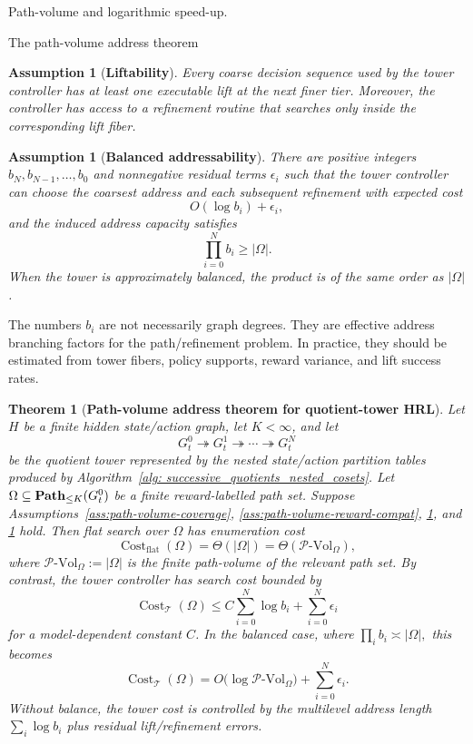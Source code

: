 \documentclass[11pt]{article}
\newtheorem{assumption}[subsubsection]{Assumption}
\newtheorem{theorem}[subsubsection]{Theorem}
\newcommand{\PVol}{\mathcal{P}\text{-}\mathrm{Vol}}
\newcommand{\cost}{\operatorname{Cost}}
\begin{document}
\begin{section}{Path-volume and logarithmic speed-up.}
\begin{subsection}{The path-volume address theorem}
\begin{assumption}[{\bf Liftability}]\label{ass:path-volume-liftability}
\normalfont
Every coarse decision sequence used by the tower controller has at least one executable lift at the next finer tier. Moreover, the controller has access to a refinement routine that searches only inside the corresponding lift fiber.
\end{assumption}

\begin{assumption}[{\bf Balanced addressability}]\label{ass:path-volume-balanced}
\normalfont
There are positive integers
$
b_N,b_{N-1},\ldots,b_0
$
and nonnegative residual terms $\epsilon_i$ such that the tower controller can choose the coarsest address and each subsequent refinement with expected cost
$$
O(\log b_i)+\epsilon_i,
$$
and the induced address capacity satisfies
$$
\prod_{i=0}^{N}b_i\ge |\Omega|.
$$
When the tower is approximately balanced, the product is of the same order as $|\Omega|$.
\end{assumption}

The numbers $b_i$ are not necessarily graph degrees. They are effective address branching factors for the path/refinement problem. In practice, they should be estimated from tower fibers, policy supports, reward variance, and lift success rates.

\begin{theorem}[{\bf Path-volume address theorem for quotient-tower HRL}]\label{thm:path-volume-address}
Let $H$ be a finite hidden state/action graph, let $K<\infty$, and let
$$
G_t^0 \twoheadrightarrow G_t^1 \twoheadrightarrow \cdots \twoheadrightarrow G_t^N
$$
be the quotient tower represented by the nested state/action partition tables produced by Algorithm~\ref{alg: successive_quotients_nested_cosets}. Let
$
\Omega\subseteq\bold{Path}_{\le K}(G_t^0)
$
be a finite reward-labelled path set. Suppose Assumptions~\ref{ass:path-volume-coverage}, \ref{ass:path-volume-reward-compat}, \ref{ass:path-volume-liftability}, and \ref{ass:path-volume-balanced} hold. Then flat search over $\Omega$ has enumeration cost
$$
\cost_{\mathrm{flat}}(\Omega)
=
\Theta(|\Omega|)
=
\Theta(\PVol_{\Omega}),
$$
where $\PVol_{\Omega}:=|\Omega|$ is the finite path-volume of the relevant path set. By contrast, the tower controller has search cost bounded by
$$
\cost_{\mathcal{T}}(\Omega)
\le
C\sum_{i=0}^{N}\log b_i+\sum_{i=0}^{N}\epsilon_i
$$
for a model-dependent constant $C$. In the balanced case, where
$
\prod_i b_i\asymp |\Omega|,
$
this becomes
$$
\cost_{\mathcal{T}}(\Omega)
=
O\bigl(\log \PVol_{\Omega}\bigr)
+
\sum_{i=0}^{N}\epsilon_i.
$$
Without balance, the tower cost is controlled by the multilevel address length $\sum_i\log b_i$ plus residual lift/refinement errors.
\end{theorem}


\end{subsection}
\end{section}
\end{document}

